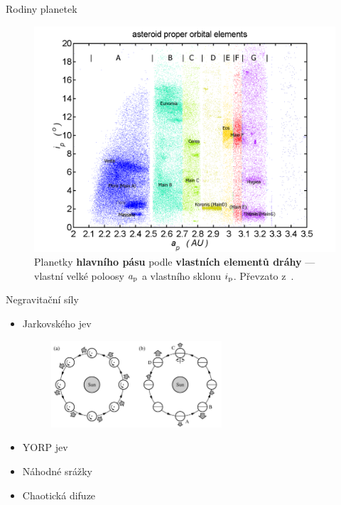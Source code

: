 \documentclass[xcolor=dvipsnames]{beamer}
\begin{document}
\begin{frame}[t]{\secname}{Rodiny planetek}
	\begin{figure}
		\centering
		\includegraphics[height=0.65\textheight,width=\textwidth,keepaspectratio]{../obr/mainbelt.png}
		\caption{\footnotesize{Planetky \textbf{hlavního pásu} podle \textbf{vlastních elementů dráhy} --- vlastní velké poloosy $a_{\rm p}$ a vlastního sklonu $i_{\rm p}$. Převzato z~\cite{wiki:belt}.}}
	\end{figure}
\end{frame}

\begin{frame}[t]{\secname}{Negravitační síly}
\begin{itemize}
\item Jarkovského jev

\begin{figure}
\centering
\includegraphics[width=0.6\textwidth]{../obr/jarkovskeho_jev.png}
\end{figure}

\item YORP jev
\item Náhodné srážky
\item Chaotická difuze
\end{itemize}

\end{frame}
\end{document}
